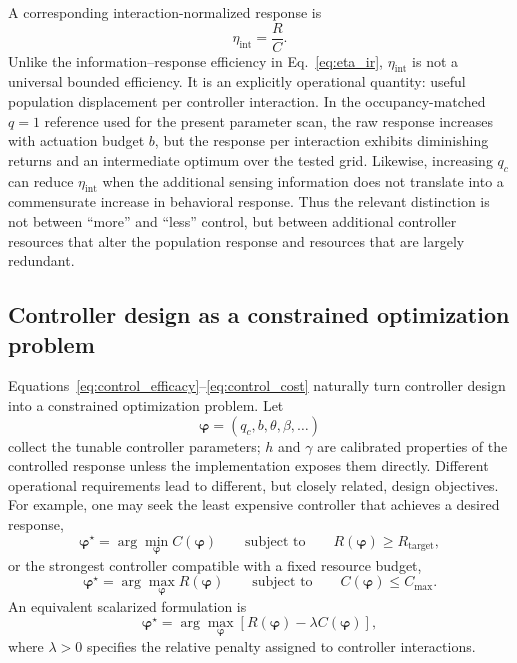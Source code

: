 A corresponding interaction-normalized response is
\begin{equation}
\boxed{
\eta_{\mathrm{int}}
=
\frac{R}{C}.
}
\label{eq:interaction_efficiency}
\end{equation}
Unlike the information--response efficiency in Eq.~\eqref{eq:eta_ir}, \(\eta_{\mathrm{int}}\) is not a universal bounded efficiency. It is an explicitly operational quantity: useful population displacement per controller interaction. In the occupancy-matched \(q=1\) reference used for the present parameter scan, the raw response increases with actuation budget \(b\), but the response per interaction exhibits diminishing returns and an intermediate optimum over the tested grid. Likewise, increasing \(q_c\) can reduce \(\eta_{\mathrm{int}}\) when the additional sensing information does not translate into a commensurate increase in behavioral response. Thus the relevant distinction is not between ``more'' and ``less'' control, but between additional controller resources that alter the population response and resources that are largely redundant.

\subsection{Controller design as a constrained optimization problem}
\label{subsec:controller_optimization}

Equations~\eqref{eq:control_efficacy}--\eqref{eq:control_cost} naturally turn controller design into a constrained optimization problem. Let
\[
\boldsymbol{\varphi}=(q_c,b,\theta,\beta,\ldots)
\]
collect the tunable controller parameters; $h$ and $\gamma$ are calibrated properties of the controlled response unless the implementation exposes them directly. Different operational requirements lead to different, but closely related, design objectives. For example, one may seek the least expensive controller that achieves a desired response,
\begin{equation}
\boxed{
\boldsymbol{\varphi}^\star
=
\arg\min_{\boldsymbol{\varphi}} C(\boldsymbol{\varphi})
\qquad
\text{subject to}
\qquad
R(\boldsymbol{\varphi})\ge R_{\mathrm{target}},
}
\label{eq:min_cost_control}
\end{equation}
or the strongest controller compatible with a fixed resource budget,
\begin{equation}
\boxed{
\boldsymbol{\varphi}^\star
=
\arg\max_{\boldsymbol{\varphi}} R(\boldsymbol{\varphi})
\qquad
\text{subject to}
\qquad
C(\boldsymbol{\varphi})\le C_{\max}.
}
\label{eq:max_response_control}
\end{equation}
An equivalent scalarized formulation is
\begin{equation}
\boxed{
\boldsymbol{\varphi}^\star
=
\arg\max_{\boldsymbol{\varphi}}
\left[
R(\boldsymbol{\varphi})-\lambda C(\boldsymbol{\varphi})
\right],
}
\label{eq:scalarized_control}
\end{equation}
where \(\lambda>0\) specifies the relative penalty assigned to controller interactions.

